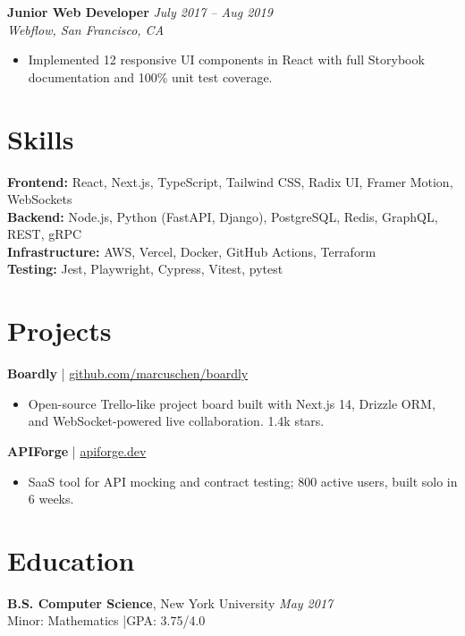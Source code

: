 \documentclass[11pt,a4paper]{article}
\begin{document}
\vspace{4pt}
\noindent\textbf{Junior Web Developer} \hfill \textit{July 2017 -- Aug 2019}\\
\textit{Webflow, San Francisco, CA}
\begin{itemize}
  \item Implemented 12 responsive UI components in React with full Storybook documentation and 100\% unit test coverage.
\end{itemize}

\section{Skills}

\noindent\textbf{Frontend:} React, Next.js, TypeScript, Tailwind CSS, Radix UI, Framer Motion, WebSockets\\
\textbf{Backend:} Node.js, Python (FastAPI, Django), PostgreSQL, Redis, GraphQL, REST, gRPC\\
\textbf{Infrastructure:} AWS, Vercel, Docker, GitHub Actions, Terraform\\
\textbf{Testing:} Jest, Playwright, Cypress, Vitest, pytest

\section{Projects}

\noindent\textbf{Boardly} \textcolor{accent}{|} \href{https://github.com/marcuschen/boardly}{github.com/marcuschen/boardly}
\begin{itemize}
  \item Open-source Trello-like project board built with Next.js 14, Drizzle ORM, and WebSocket-powered live collaboration. 1.4k stars.
\end{itemize}

\noindent\textbf{APIForge} \textcolor{accent}{|} \href{https://apiforge.dev}{apiforge.dev}
\begin{itemize}
  \item SaaS tool for API mocking and contract testing; 800 active users, built solo in 6 weeks.
\end{itemize}

\section{Education}
\textbf{B.S. Computer Science}, New York University \hfill \textit{May 2017}\\
Minor: Mathematics \quad|\quad GPA: 3.75/4.0
\end{document}
